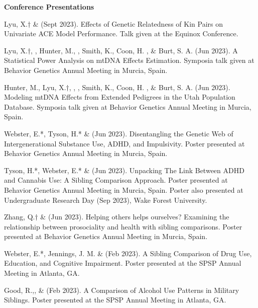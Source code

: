 {\large {\bf Conference Presentations}}
\begin{etaremune}

\item Lyu, X.$\dagger$ \& \meb (Sept 2023). Effects of Genetic Relatedness of Kin Pairs on Univariate ACE Model Performance. Talk given at the Equinox Conference.
\item Lyu, X.$\dagger$, \meb, Hunter, M.,  \Joe, Smith, K., Coon, H. , \& Burt, S. A. (Jun 2023). A Statistical Power Analysis on mtDNA Effects Estimation. Symposia talk given at Behavior Genetics Annual Meeting in Murcia, Spain.

\item Hunter, M., Lyu, X.$\dagger$, \meb,  \Joe, Smith, K., Coon, H. , \& Burt, S. A. (Jun 2023). Modeling mtDNA Effects from Extended Pedigrees in the Utah Population Database. Symposia talk given at Behavior Genetics Annual Meeting in Murcia, Spain.


\item Webster, E.*, Tyson, H.* \& \meb (Jun 2023). Disentangling the Genetic Web of Intergenerational Substance Use, ADHD, and Impulsivity. Poster presented at Behavior Genetics Annual Meeting in Murcia, Spain.

\item Tyson, H.*, Webster, E.*  \& \meb (Jun 2023). Unpacking The Link Between ADHD and Cannabis Use: A Sibling Comparison Approach. Poster presented at Behavior Genetics Annual Meeting in Murcia, Spain. Poster also presented at Undergraduate Research Day (Sep 2023), Wake Forest University.

\item Zhang, Q.$\dagger$ \& \meb (Jun 2023). Helping others helps ourselves? Examining the relationship between prosociality and health with sibling comparisons. Poster presented at Behavior Genetics Annual Meeting in Murcia, Spain.

\item Webster, E.*, Jennings, J. M. \& \meb (Feb 2023). A Sibling Comparison of Drug Use, Education, and Cognitive Impairment. Poster presented at the SPSP Annual Meeting in Atlanta, GA.

\item Good, R.,\noteA \yrh, \&  \meb (Feb 2023). A Comparison of Alcohol Use Patterns in Military Siblings.  Poster presented at the SPSP Annual Meeting in Atlanta, GA.


\end{etaremune}
